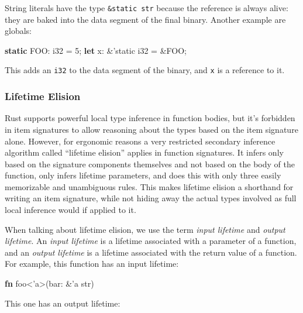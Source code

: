 \documentclass[a4paper,]{book}
\newenvironment{Shaded}{\begin{snugshade}}{\end{snugshade}}
\newcommand{\KeywordTok}[1]{\textcolor[rgb]{0.13,0.29,0.53}{\textbf{{#1}}}}
\newcommand{\DataTypeTok}[1]{\textcolor[rgb]{0.13,0.29,0.53}{{#1}}}
\newcommand{\DecValTok}[1]{\textcolor[rgb]{0.00,0.00,0.81}{{#1}}}
\newcommand{\OtherTok}[1]{\textcolor[rgb]{0.56,0.35,0.01}{{#1}}}
\newcommand{\NormalTok}[1]{{#1}}
\begin{document}
String literals have the type \texttt{\&\textquotesingle{}static\ str}
because the reference is always alive: they are baked into the data
segment of the final binary. Another example are globals:

\begin{Shaded}
\begin{Highlighting}[]
\KeywordTok{static} \NormalTok{FOO: }\DataTypeTok{i32} \NormalTok{= }\DecValTok{5}\NormalTok{;}
\KeywordTok{let} \NormalTok{x: &}\OtherTok{'static} \DataTypeTok{i32} \NormalTok{= &FOO;}
\end{Highlighting}
\end{Shaded}

This adds an \texttt{i32} to the data segment of the binary, and
\texttt{x} is a reference to it.

\subsubsection{Lifetime Elision}\label{lifetime-elision}

Rust supports powerful local type inference in function bodies, but it's
forbidden in item signatures to allow reasoning about the types based on
the item signature alone. However, for ergonomic reasons a very
restricted secondary inference algorithm called ``lifetime elision''
applies in function signatures. It infers only based on the signature
components themselves and not based on the body of the function, only
infers lifetime parameters, and does this with only three easily
memorizable and unambiguous rules. This makes lifetime elision a
shorthand for writing an item signature, while not hiding away the
actual types involved as full local inference would if applied to it.

When talking about lifetime elision, we use the term \emph{input
lifetime} and \emph{output lifetime}. An \emph{input lifetime} is a
lifetime associated with a parameter of a function, and an \emph{output
lifetime} is a lifetime associated with the return value of a function.
For example, this function has an input lifetime:

\begin{Shaded}
\begin{Highlighting}[]
\KeywordTok{fn} \NormalTok{foo<}\OtherTok{'a}\NormalTok{>(bar: &}\OtherTok{'a} \DataTypeTok{str}\NormalTok{)}
\end{Highlighting}
\end{Shaded}

This one has an output lifetime:
\end{document}
